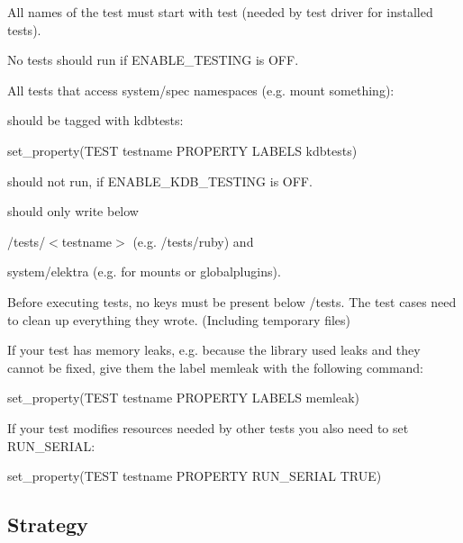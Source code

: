 \begin{DoxyItemize}
\item All names of the test must start with test (needed by test driver for installed tests).
\item No tests should run if E\+N\+A\+B\+L\+E\+\_\+\+T\+E\+S\+T\+I\+NG is O\+FF.
\item All tests that access system/spec namespaces (e.\+g. mount something)\+:
\begin{DoxyItemize}
\item should be tagged with {\ttfamily kdbtests}\+: \begin{DoxyVerb} set_property(TEST testname PROPERTY LABELS kdbtests)
\end{DoxyVerb}

\item should not run, if {\ttfamily E\+N\+A\+B\+L\+E\+\_\+\+K\+D\+B\+\_\+\+T\+E\+S\+T\+I\+NG} is O\+FF.
\item should only write below
\begin{DoxyItemize}
\item {\ttfamily /tests/$<$testname$>$} (e.\+g. {\ttfamily /tests/ruby}) and
\item {\ttfamily system/elektra} (e.\+g. for mounts or globalplugins).
\end{DoxyItemize}
\item Before executing tests, no keys must be present below {\ttfamily /tests}. The test cases need to clean up everything they wrote. (Including temporary files)
\end{DoxyItemize}
\item If your test has memory leaks, e.\+g. because the library used leaks and they cannot be fixed, give them the label {\ttfamily memleak} with the following command\+: \begin{DoxyVerb}  set_property(TEST testname PROPERTY LABELS memleak)
\end{DoxyVerb}

\item If your test modifies resources needed by other tests you also need to set {\ttfamily R\+U\+N\+\_\+\+S\+E\+R\+I\+AL}\+: \begin{DoxyVerb}set_property(TEST testname PROPERTY RUN_SERIAL TRUE)
\end{DoxyVerb}

\end{DoxyItemize}

\subsection*{Strategy}

